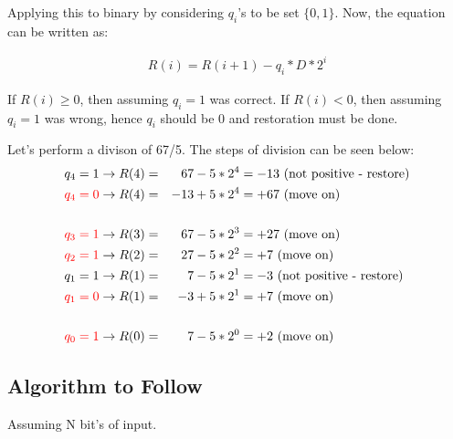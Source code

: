 \documentclass{article}
\begin{document}
Applying this to binary by considering $q_i$'s to be set $\{0, 1\}$.
Now, the equation can be written as:

\begin{align*}
    R(i) = R(i + 1) - q_i * D * 2^i
\end{align*}

If $R(i) \ge 0$, then assuming $q_i = 1$ was correct.
If $R(i) < 0$, then assuming $q_i = 1$ was wrong, hence $q_i$ should be 0 and restoration must be done.

Let's perform a divison of 67/5.
The steps of division can be seen below:
\begin{align*}
    q_4 = 1                  & \rightarrow R(4) = & 67 - 5 * 2^4  & = -13 \text{ (not positive - restore)} \\
    \textcolor{red}{q_4 = 0} & \rightarrow R(4) = & -13 + 5 * 2^4 & = +67 \text{ (move on)}                \\
    \\
    \textcolor{red}{q_3 = 1} & \rightarrow R(3) = & 67 - 5 * 2^3  & = +27 \text{ (move on)}                \\
    \textcolor{red}{q_2 = 1} & \rightarrow R(2) = & 27 - 5 * 2^2  & = +7 \text{ (move on)}                 \\
    q_1 = 1                  & \rightarrow R(1) = & 7 - 5 * 2^1   & = -3 \text{ (not positive - restore)}  \\
    \textcolor{red}{q_1 = 0} & \rightarrow R(1) = & -3 + 5 * 2^1  & = +7 \text{ (move on)}                 \\
    \\
    \textcolor{red}{q_0 = 1} & \rightarrow R(0) = & 7 - 5 * 2^0   & = +2 \text{ (move on)}                 \\
\end{align*}

\subsection{Algorithm to Follow}
Assuming N bit's of input.
\end{document}
